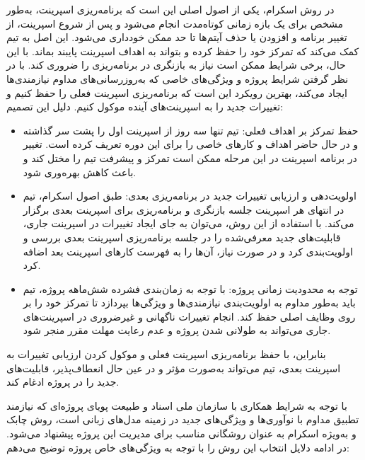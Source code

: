 در روش اسکرام، یکی از اصول اصلی این است که برنامه‌ریزی اسپرینت، به‌طور مشخص برای یک بازه زمانی کوتاه‌مدت انجام می‌شود و پس از شروع اسپرینت، از تغییر برنامه و افزودن یا حذف آیتم‌ها تا حد ممکن خودداری می‌شود. این اصل به تیم کمک می‌کند که تمرکز خود را حفظ کرده و بتواند به اهداف اسپرینت پایبند بماند. با این حال، برخی شرایط ممکن است نیاز به بازنگری در برنامه‌ریزی را ضروری کند.
با در نظر گرفتن شرایط پروژه و ویژگی‌های خاصی که به‌روزرسانی‌های مداوم نیازمندی‌ها ایجاد می‌کند، بهترین رویکرد این است که برنامه‌ریزی اسپرینت فعلی را حفظ کنیم و تغییرات جدید را به اسپرینت‌های آینده موکول کنیم. دلیل این تصمیم:

\begin{itemize}
    \item حفظ تمرکز بر اهداف فعلی: تیم تنها سه روز از اسپرینت اول را پشت سر گذاشته و در حال حاضر اهداف و کارهای خاصی را برای این دوره تعریف کرده است. تغییر در برنامه اسپرینت در این مرحله ممکن است تمرکز و پیشرفت تیم را مختل کند و باعث کاهش بهره‌وری شود.
    \item اولویت‌دهی و ارزیابی تغییرات جدید در برنامه‌ریزی بعدی: طبق اصول اسکرام، تیم در انتهای هر اسپرینت جلسه بازنگری و برنامه‌ریزی برای اسپرینت بعدی برگزار می‌کند. با استفاده از این روش، می‌توان به جای ایجاد تغییرات در اسپرینت جاری، قابلیت‌های جدید معرفی‌شده را در جلسه برنامه‌ریزی اسپرینت بعدی بررسی و اولویت‌بندی کرد و در صورت نیاز، آن‌ها را به فهرست کارهای اسپرینت بعد اضافه کرد.
    \item توجه به محدودیت زمانی پروژه: با توجه به زمان‌بندی فشرده شش‌ماهه پروژه، تیم باید به‌طور مداوم به اولویت‌بندی نیازمندی‌ها و ویژگی‌ها بپردازد تا تمرکز خود را بر روی وظایف اصلی حفظ کند. انجام تغییرات ناگهانی و غیرضروری در اسپرینت‌های جاری می‌تواند به طولانی شدن پروژه و عدم رعایت مهلت مقرر منجر شود.
\end{itemize}

بنابراین، با حفظ برنامه‌ریزی اسپرینت فعلی و موکول کردن ارزیابی تغییرات به اسپرینت بعدی، تیم می‌تواند به‌صورت مؤثر و در عین حال انعطاف‌پذیر، قابلیت‌های جدید را در پروژه ادغام کند.


با توجه به شرایط همکاری با سازمان ملی اسناد و طبیعت پویای پروژه‌ای که نیازمند تطبیق مداوم با نوآوری‌ها و ویژگی‌های جدید در زمینه مدل‌های زبانی است، روش چابک و به‌ویژه اسکرام به عنوان روشگانی مناسب برای مدیریت این پروژه پیشنهاد می‌شود. در ادامه دلایل انتخاب این روش را با توجه به ویژگی‌های خاص پروژه توضیح می‌دهم:

